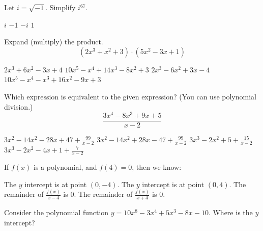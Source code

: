 \documentclass[12pt]{exam}
\begin{document}
\begin{questions}
\newpage


\question Let $i=\sqrt{-1}$. Simplify $i^{67}$.

\begin{choices} 
	\choice $i$
	\choice $-1$
	\correctchoice $-i$
	\choice $1$
\end{choices}

\vfill


\question Expand (multiply) the product. $$(2x^3+x^2+3)\cdot (5x^2-3x+1)$$

\begin{choices} 
	\choice $2x^3+6x^2-3x+4$
	\choice $10x^5-x^4+14x^3-8x^2+3$
	\choice $2x^3-6x^2+3x-4$
	\correctchoice $10x^5-x^4-x^3+16x^2-9x+3$
\end{choices}

\vfill

\question Which expression is equivalent to the given expression? (You can use polynomial division.)
$$\frac{3x^4-8x^3+9x+5}{x-2}$$

\begin{choices} 
	\choice $3x^2-14x^2-28x+47+\frac{99}{x-2}$
	\choice $3x^2-14x^2+28x-47+\frac{99}{x-2}$
	\choice $3x^3-2x^2+5+\frac{15}{x-2}$
	\correctchoice $3x^3-2x^2-4x+1+\frac{7}{x-2}$
\end{choices}

\vfill

\newpage

\question If $f(x)$ is a polynomial, and $f(4)=0$, then we know:

\begin{choices} 
	\choice The $y$ intercept is at point $(0,-4)$.
	\choice The $y$ intercept is at point $(0,4)$.
	\correctchoice The remainder of $\frac{f(x)}{x-4}$ is 0.
	\choice The remainder of $\frac{f(x)}{x+4}$ is 0.
\end{choices}

\vfill

\question Consider the polynomial function $y=10x^8-3x^4+5x^3-8x-10$. Where is the $y$ intercept?


\end{questions}
\end{document}

